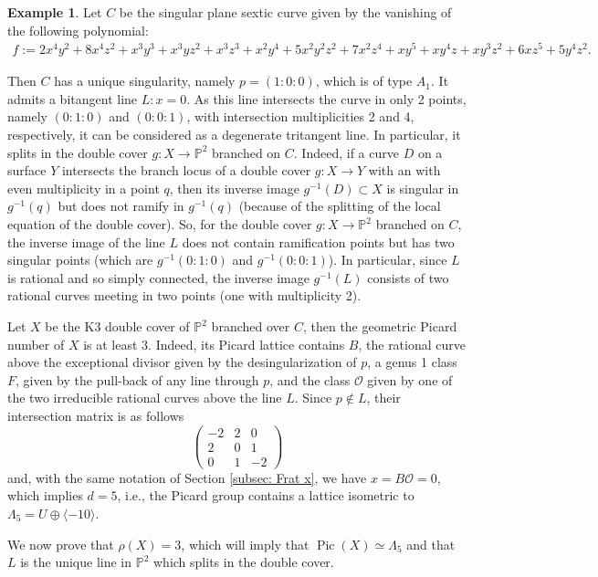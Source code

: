 \documentclass{amsart}
\theoremstyle{definition}
\newtheorem{example}[theorem]{Example}
\numberwithin{equation}{section}
\newcommand{\ra}{\rightarrow}
\renewcommand{\O}{\mathcal{O}}
\DeclareMathOperator{\Pic}{Pic}
\begin{document}
\begin{example}\label{ex:picard 3 over Q}
Let $C$ be the singular plane sextic curve given by the vanishing of the following polynomial:
\begin{align*}
f:=2x^4y^2  + 8x^4z^2 + x^3y^3 + x^3yz^2 + x^3z^3  + x^2y^4 + 5x^2y^2z^2 + 7x^2z^4 + xy^5+xy^4z +xy^3z^2 + 6xz^5 + 5y^4z^2.
\end{align*}


Then $C$ has a unique singularity, namely $p=(1:0:0)$, which is of type $A_1$. It admits a bitangent line $L: x=0$. As this line intersects the curve in only 2 points, namely $(0:1:0)$ and $(0:0:1)$, with intersection multiplicities 2 and 4, respectively, it can be considered as a degenerate tritangent line. In particular, it splits in the double cover $g:X\ra \mathbb{P}^2$ branched on $C$. Indeed, if a curve $D$ on a surface $Y$ intersects the branch locus of a double cover $g:X\ra Y$ with an with even multiplicity in a point $q$, then its inverse image $g^{-1}(D)\subset X$ is singular in $g^{-1}(q)$ but does not ramify in $g^{-1}(q)$ (because of the splitting of the local equation of the double cover). So, for the double cover $g:X\ra \mathbb{P}^2$ branched on $C$, the inverse image of the line $L$ does not contain ramification points but has two singular points (which are  $g^{-1}(0:1:0)$ and $g^{-1}(0:0:1)$). In particular, since $L$ is rational and so simply connected, the inverse image $g^{-1}(L)$ consists of two rational curves meeting in two points (one with multiplicity 2).

Let $X$ be the K3 double cover of $\mathbb{P}^2$ branched over $C$, then the geometric Picard number of $X$ is at least 3.  Indeed, its Picard lattice contains $B$, the rational curve above the exceptional divisor given by the desingularization of $p$, a genus 1 class $F$, given by the pull-back of any line through $p$, and the class $\O$ given by one of the two irreducible rational curves above the line $L$. Since $p\not\in L$, their intersection matrix is as follows
$$
\begin{pmatrix}-2&2&0\\
	2&0&1\\
	0&1&-2
	\end{pmatrix}
$$
and, with the same notation of Section \ref{subsec: Frat x}, we have $x=B\O=0$, which implies $d=5$, i.e., the Picard group contains a lattice isometric to $\Lambda_{5}=U\oplus \langle -10\rangle$. 

We now prove that $\rho(X)=3$, which will imply that $\Pic(X)\simeq \Lambda_{5}$ and that $L$ is the unique line in $\mathbb{P}^2$ which splits in the double cover.


\end{example}
\end{document}
